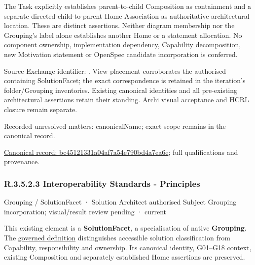The Task explicitly establishes parent-to-child Composition as containment and
a separate directed child-to-parent Home Association as authoritative architectural
location. These are distinct assertions. Neither diagram membership nor the
Grouping's label alone establishes another Home or a statement allocation.
No component ownership, implementation dependency, Capability decomposition,
new Motivation statement or OpenSpec candidate incorporation is conferred.



Source Exchange identifier: \texttt{}. View placement corroborates
the authorised containing SolutionFacet; the exact correspondence is retained in the
iteration's folder/Grouping inventories. Existing canonical identities and all
pre-existing architectural assertions retain their standing. Archi visual
acceptance and HCRL closure remain separate.


{\small Recorded unresolved matters: canonicalName; exact scope remains in the canonical record.}\par
{\footnotesize \href{../../../../../../../continuum/grouping/bc45121331a04af7a54e790bd4a7ea6e.md}{Canonical record: bc45121331a04af7a54e790bd4a7ea6e}; full qualifications and provenance.}\par
\subsubsection*{R.3.5.2.3 Interoperability Standards - Principles}
\label{navigation:R.3.5.2.3}

\label{element:db0cac8c53b7404b8f2c17a542db7604}
{\small Grouping / SolutionFacet · Solution Architect authorised Subject Grouping incorporation; visual/result review pending · current}\par

This existing element is a \textbf{SolutionFacet}, a specialisation of native
\textbf{Grouping}. The \href{\detokenize{../../../../../../../governance/continuum-representation.md#solutionfacet-classification--1119-candidate}}{governed definition}
distinguishes accessible solution classification from Capability, responsibility
and ownership. Its canonical identity, G01–G18 context, existing Composition
and separately established Home assertions are preserved.



